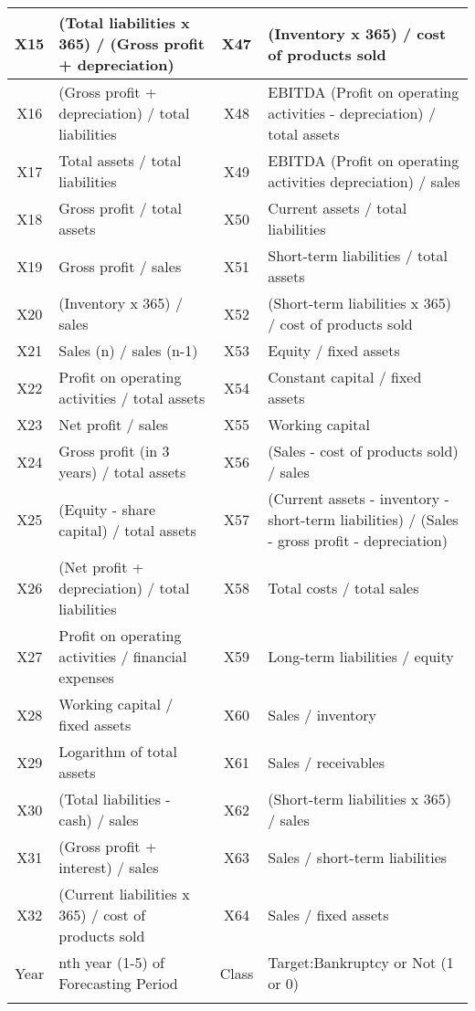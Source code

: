 \documentclass{article}      %
\begin{document}
\begin{table}[!h]
\begin{tabular}{|c|p{6.5cm}|c|p{6.5cm}|}
    \hline
    X15 & (Total liabilities x 365) / (Gross profit + depreciation) & X47 & (Inventory x 365) / cost of products sold \\
    \hline
    X16 & (Gross profit + depreciation) / total liabilities & X48 & EBITDA (Profit on operating activities - depreciation) / total assets \\
    \hline
    X17 & Total assets / total liabilities & X49 & EBITDA (Profit on operating activities depreciation) / sales \\
    \hline
    X18 & Gross profit / total assets & X50 & Current assets / total liabilities \\
    \hline
    X19 & Gross profit / sales & X51 & Short-term liabilities / total assets \\
    \hline
    X20 & (Inventory x 365) / sales & X52 & (Short-term liabilities x 365) / cost of products sold \\
    \hline
    X21 & Sales (n) / sales (n-1) & X53 & Equity / fixed assets \\
    \hline
    X22 & Profit on operating activities / total assets & X54 & Constant capital / fixed assets \\
    \hline
    X23 & Net profit / sales & X55 & Working capital \\
    \hline
    X24 & Gross profit (in 3 years) / total assets & X56 & (Sales - cost of products sold) / sales \\
    \hline
    X25 & (Equity - share capital) / total assets & X57 & (Current assets - inventory - short-term liabilities) / (Sales - gross profit - depreciation) \\
    \hline
    X26 & (Net profit + depreciation) / total liabilities & X58 & Total costs / total sales \\
    \hline
    X27 & Profit on operating activities / financial expenses & X59 & Long-term liabilities / equity \\
    \hline
    X28 & Working capital / fixed assets & X60 & Sales / inventory \\
    \hline
    X29 & Logarithm of total assets & X61 & Sales / receivables \\
    \hline
    X30 & (Total liabilities - cash) / sales & X62 & (Short-term liabilities x 365) / sales \\
    \hline
    X31 & (Gross profit + interest) / sales & X63 & Sales / short-term liabilities \\
    \hline
    X32 & (Current liabilities x 365) / cost of products sold & X64 & Sales / fixed assets \\
    Year & nth year (1-5) of Forecasting Period & Class & Target:Bankruptcy or Not (1 or 0) \\
    \arrayrulecolor{black}
    \bottomrule
    \end{tabular}
    \label{table:features}
\end{table}
\end{document}
